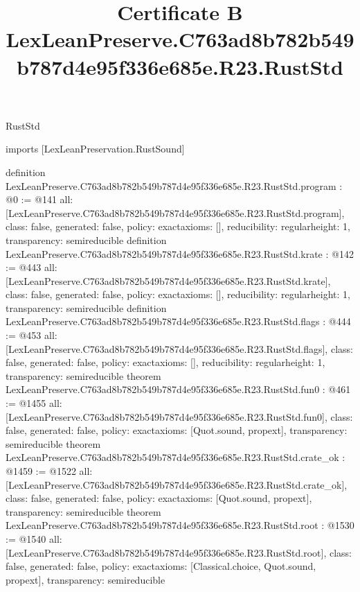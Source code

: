 \begin{lexlean}{RustStd}
\title{Certificate B LexLeanPreserve.C763ad8b782b549b787d4e95f336e685e.R23.RustStd}
\begin{coremodule}
imports [LexLeanPreservation.RustSound]

definition LexLeanPreserve.C763ad8b782b549b787d4e95f336e685e.R23.RustStd.program : @0 := @141 {
  all: [LexLeanPreserve.C763ad8b782b549b787d4e95f336e685e.R23.RustStd.program],
  class: false,
  generated: false,
  policy: exact{axioms: []},
  reducibility: regular{height: 1},
  transparency: semireducible
}
definition LexLeanPreserve.C763ad8b782b549b787d4e95f336e685e.R23.RustStd.krate : @142 := @443 {
  all: [LexLeanPreserve.C763ad8b782b549b787d4e95f336e685e.R23.RustStd.krate],
  class: false,
  generated: false,
  policy: exact{axioms: []},
  reducibility: regular{height: 1},
  transparency: semireducible
}
definition LexLeanPreserve.C763ad8b782b549b787d4e95f336e685e.R23.RustStd.flags : @444 := @453 {
  all: [LexLeanPreserve.C763ad8b782b549b787d4e95f336e685e.R23.RustStd.flags],
  class: false,
  generated: false,
  policy: exact{axioms: []},
  reducibility: regular{height: 1},
  transparency: semireducible
}
theorem LexLeanPreserve.C763ad8b782b549b787d4e95f336e685e.R23.RustStd.fun0 : @461 := @1455 {
  all: [LexLeanPreserve.C763ad8b782b549b787d4e95f336e685e.R23.RustStd.fun0],
  class: false,
  generated: false,
  policy: exact{axioms: [Quot.sound, propext]},
  transparency: semireducible
}
theorem LexLeanPreserve.C763ad8b782b549b787d4e95f336e685e.R23.RustStd.crate_ok : @1459 := @1522 {
  all: [LexLeanPreserve.C763ad8b782b549b787d4e95f336e685e.R23.RustStd.crate_ok],
  class: false,
  generated: false,
  policy: exact{axioms: [Quot.sound, propext]},
  transparency: semireducible
}
theorem LexLeanPreserve.C763ad8b782b549b787d4e95f336e685e.R23.RustStd.root : @1530 := @1540 {
  all: [LexLeanPreserve.C763ad8b782b549b787d4e95f336e685e.R23.RustStd.root],
  class: false,
  generated: false,
  policy: exact{axioms: [Classical.choice, Quot.sound, propext]},
  transparency: semireducible
}


\end{coremodule}
\end{lexlean}
